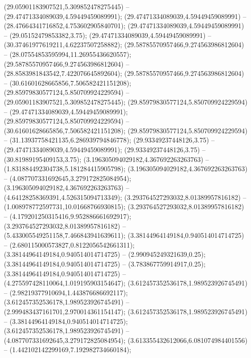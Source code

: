  (29.05901183907521,5.309852478275445) -- (29.47471334089039,4.59449459089991);
 (29.47471334089039,4.59449459089991) -- (28.47664341716852,4.753602905840701);
 (29.47471334089039,4.59449459089991) -- (29.05152479853382,3.75);
 (29.47471334089039,4.59449459089991) -- (30.37461977619211,4.62237507258882);
 (29.58785570957466,9.274563986812604) -- (28.07554853595994,11.26955436620557);
 (29.58785570957466,9.274563986812604) -- (28.8583981843542,7.422076645892604);
 (29.58785570957466,9.274563986812604) -- (30.61601628665856,7.506582421151208);
 (29.85979830577124,5.850709924229594) -- (29.05901183907521,5.309852478275445);
 (29.85979830577124,5.850709924229594) -- (29.47471334089039,4.59449459089991);
 (29.85979830577124,5.850709924229594) -- (30.61601628665856,7.506582421151208);
 (29.85979830577124,5.850709924229594) -- (31.13937758421135,6.286939794846778);
 (29.93349237448126,3.75) -- (29.47471334089039,4.59449459089991);
 (29.93349237448126,3.75) -- (30.81989195409153,3.75);
 (3.196305094029182,4.367692263263763) -- (1.831884492304738,5.181284415905798);
 (3.196305094029182,4.367692263263763) -- (4.087707331692645,3.279172825084954);
 (3.196305094029182,4.367692263263763) -- (4.64128258369391,4.526315094713349);
 (3.293764527293032,8.01389957816182) -- (1.008978772597731,10.01668766930815);
 (3.293764527293032,8.01389957816182) -- (4.179201250315416,9.952886661692917);
 (3.293764527293032,8.01389957816182) -- (5.433005549251158,7.466843941639611);
 (3.38144964149184,0.940514014714725) -- (2.680115000573827,0.8122056542661311);
 (3.38144964149184,0.940514014714725) -- (2.990945249321639,0.25);
 (3.38144964149184,0.940514014714725) -- (3.783867759914917,0.25);
 (3.38144964149184,0.940514014714725) -- (4.275597428110064,1.019195903154647);
 (3.612457352536178,1.989523926745491) -- (2.98219377910694,1.443876686692117);
 (3.612457352536178,1.989523926745491) -- (2.999483437161701,2.970014361154147);
 (3.612457352536178,1.989523926745491) -- (3.38144964149184,0.940514014714725);
 (3.612457352536178,1.989523926745491) -- (4.087707331692645,3.279172825084954);
 (3.613355432612066,6.081074984401556) -- (1.442102142299169,7.192982734660184);
